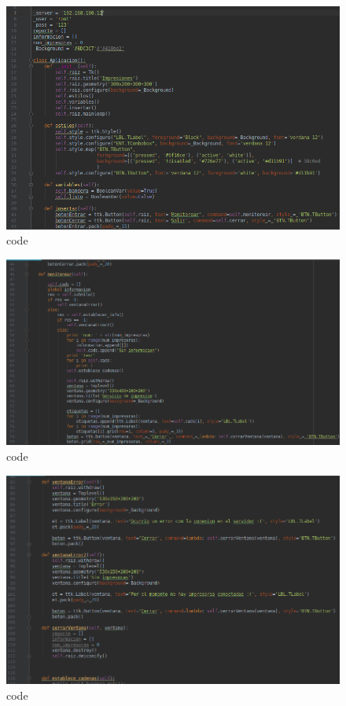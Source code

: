 \FloatBarrier
\begin{figure}[htbp!]
		\centering
			\includegraphics[width=.9\textwidth]{images/s1}
		\caption{code}
		\label{image:s1}
\end{figure}
\FloatBarrier

\FloatBarrier
\begin{figure}[htbp!]
		\centering
			\includegraphics[width=.9\textwidth]{images/s2}
		\caption{code}
		\label{image:s2}
\end{figure}
\FloatBarrier

\FloatBarrier
\begin{figure}[htbp!]
		\centering
			\includegraphics[width=.9\textwidth]{images/s3}
		\caption{code}
		\label{image:s3}
\end{figure}
\FloatBarrier

